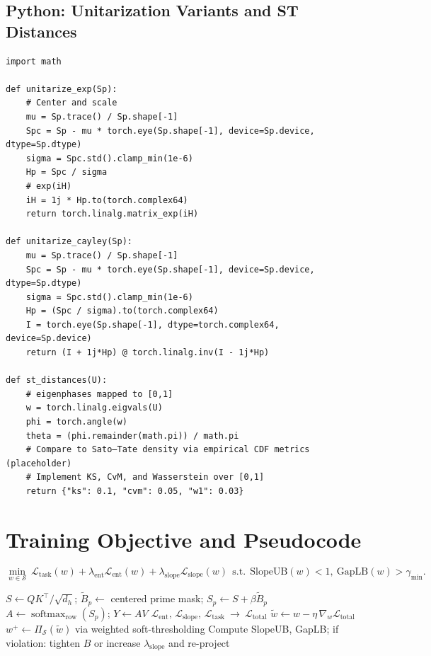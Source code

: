 \documentclass[11pt]{article}
\newcommand{\softmax}{\operatorname{softmax}}
\theoremstyle{definition}
\theoremstyle{remark}
\begin{document}
\subsection*{Python: Unitarization Variants and ST Distances}
\begin{lstlisting}[style=spasc,caption={Exponential-map unitarization, Cayley alternative, and Sato–Tate distances.}]
import math

def unitarize_exp(Sp):
    # Center and scale
    mu = Sp.trace() / Sp.shape[-1]
    Spc = Sp - mu * torch.eye(Sp.shape[-1], device=Sp.device, dtype=Sp.dtype)
    sigma = Spc.std().clamp_min(1e-6)
    Hp = Spc / sigma
    # exp(iH)
    iH = 1j * Hp.to(torch.complex64)
    return torch.linalg.matrix_exp(iH)

def unitarize_cayley(Sp):
    mu = Sp.trace() / Sp.shape[-1]
    Spc = Sp - mu * torch.eye(Sp.shape[-1], device=Sp.device, dtype=Sp.dtype)
    sigma = Spc.std().clamp_min(1e-6)
    Hp = (Spc / sigma).to(torch.complex64)
    I = torch.eye(Sp.shape[-1], dtype=torch.complex64, device=Sp.device)
    return (I + 1j*Hp) @ torch.linalg.inv(I - 1j*Hp)

def st_distances(U):
    # eigenphases mapped to [0,1]
    w = torch.linalg.eigvals(U)
    phi = torch.angle(w)
    theta = (phi.remainder(math.pi)) / math.pi
    # Compare to Sato–Tate density via empirical CDF metrics (placeholder)
    # Implement KS, CvM, and Wasserstein over [0,1]
    return {"ks": 0.1, "cvm": 0.05, "w1": 0.03}
\end{lstlisting}

\section{Training Objective and Pseudocode}
\begin{equation}
\min_{w\in\mathcal{S}}\ \mathcal{L}_{\mathrm{task}}(w) + \lambda_{\mathrm{ent}}\mathcal{L}_{\mathrm{ent}}(w) + \lambda_{\mathrm{slope}}\mathcal{L}_{\mathrm{slope}}(w)\ \ \text{s.t.}\ \ \text{SlopeUB}(w)<1,\ \text{GapLB}(w)>\gamma_{\min}.
\end{equation}

\begin{algorithm}[H]
\caption{SPASC step with ACE projection and certificates}
\begin{algorithmic}[1]
\State $S\gets QK^\top/\sqrt{d_h}$; $\widetilde{B}_p\gets$ centered prime mask; $S_p\gets S+\beta\widetilde{B}_p$
\State $A\gets \softmax_{\text{row}}(S_p)$; $Y\gets A V$
\State $\mathcal{L}_{\mathrm{ent}},\,\mathcal{L}_{\mathrm{slope}},\,\mathcal{L}_{\mathrm{task}} \ \rightarrow \ \mathcal{L}_{\mathrm{total}}$
\State $\tilde w \gets w - \eta\,\nabla_w\mathcal{L}_{\mathrm{total}}$
\State $w^+ \gets \Pi_{\mathcal{S}}(\tilde w)$ via weighted soft-thresholding
\State Compute SlopeUB, GapLB; if violation: tighten $B$ or increase $\lambda_{\mathrm{slope}}$ and re-project
\end{algorithmic}
\end{algorithm}
\end{document}
